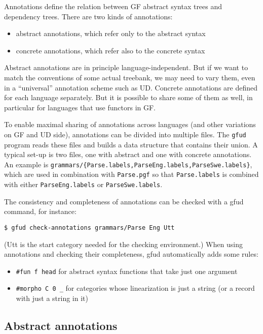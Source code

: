 Annotations define the relation between GF abstract syntax trees and
dependency trees. There are two kinds of annotations:

\begin{itemize}
\item
  abstract annotations, which refer only to the abstract syntax
\item
  concrete annotations, which refer also to the concrete syntax
\end{itemize}

Abstract annotations are in principle language-independent. But if we
want to match the conventions of some actual treebank, we may need to
vary them, even in a ``universal'' annotation scheme such as UD.
Concrete annotations are defined for each language separately. But it is
possible to share some of them as well, in particular for languages that
use functors in GF.

To enable maximal sharing of annotations across languages (and other
variations on GF and UD side), annotations can be divided into multiple
files. The \texttt{gfud} program reads these files and builds a data
structure that contains their union. A typical set-up is two files, one
with abstract and one with concrete annotations. An example is
\texttt{grammars/\{Parse.labels,ParseEng.labels,ParseSwe.labels\}},
which are used in combination with \texttt{Parse.pgf} so that
\texttt{Parse.labels} is combined with either \texttt{ParseEng.labels}
or \texttt{ParseSwe.labels}.

The consistency and completeness of annotations can be checked with a
gfud command, for instance:

\begin{verbatim}
$ gfud check-annotations grammars/Parse Eng Utt
\end{verbatim}

(Utt is the start category needed for the checking environment.) When
using annotations and checking their completeness, gfud automatically
adds some rules:

\begin{itemize}
\item
  \texttt{\#fun\ f\ head} for abstract syntax functions that take just
  one argument
\item
  \texttt{\#morpho\ C\ 0\ \_} for categories whose linearization is just
  a string (or a record with just a string in it)
\end{itemize}

\hypertarget{abstract-annotations}{%
\subsection{Abstract annotations}\label{abstract-annotations}}

